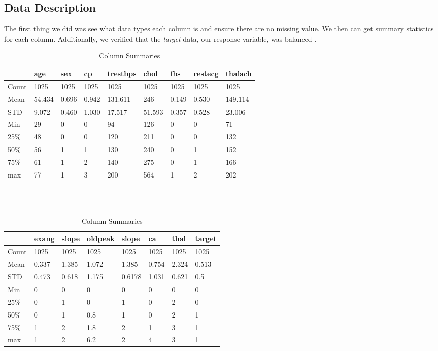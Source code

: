 \documentclass[letter]{article}
\begin{document}
\subsection{Data Description}
The first thing we did was see what data types each column is and ensure there are no missing value.  We then can get summary statistics for each column.  Additionally, we verified that the \textit{target} data, our response variable, was balanced \citep{elem_stat_learn_unsup}.
\begin{table}[]
	\begin{tabular}{@{}lllllllll@{}}
		\toprule
		& age    & sex   & cp    & trestbps & chol   & fbs   & restecg & thalach \\ \midrule
		Count & 1025   & 1025  & 1025  & 1025     & 1025   & 1025  & 1025    & 1025    \\
		Mean  & 54.434 & 0.696 & 0.942 & 131.611  & 246    & 0.149 & 0.530   & 149.114 \\
		STD   & 9.072  & 0.460 & 1.030 & 17.517   & 51.593 & 0.357 & 0.528   & 23.006  \\
		Min   & 29     & 0     & 0     & 94       & 126    & 0     & 0       & 71      \\
		25\%  & 48     & 0     & 0     & 120      & 211    & 0     & 0       & 132     \\
		50\%  & 56     & 1     & 1     & 130      & 240    & 0     & 1       & 152     \\
		75\%  & 61     & 1     & 2     & 140      & 275    & 0     & 1       & 166     \\
		max   & 77     & 1     & 3     & 200      & 564    & 1     & 2       & 202     \\ \bottomrule
	\end{tabular}\\
\\
\begin{tabular}{@{}llllllll@{}}
	\toprule
	& exang & slope & oldpeak & slope  & ca    & thal  & target \\ \midrule
	Count & 1025  & 1025  & 1025    & 1025   & 1025  & 1025  & 1025   \\
	Mean  & 0.337 & 1.385 & 1.072   & 1.385  & 0.754 & 2.324 & 0.513  \\
	STD   & 0.473 & 0.618 & 1.175   & 0.6178 & 1.031 & 0.621 & 0.5    \\
	Min   & 0     & 0     & 0       & 0      & 0     & 0     & 0      \\
	25\%  & 0     & 1     & 0       & 1      & 0     & 2     & 0      \\
	50\%  & 0     & 1     & 0.8     & 1      & 0     & 2     & 1      \\
	75\%  & 1     & 2     & 1.8     & 2      & 1     & 3     & 1      \\
	max   & 1     & 2     & 6.2     & 2      & 4     & 3     & 1      \\ \bottomrule
\end{tabular}
\caption{Column Summaries}
\label{tab:col_summary}
\end{table}
\end{document}
